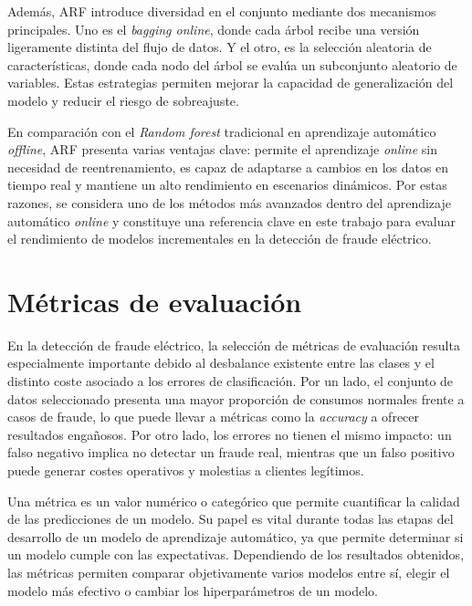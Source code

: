 \documentclass[12pt,a4paper]{report}
\begin{document}
Además, ARF introduce diversidad en el conjunto mediante dos mecanismos principales. Uno es el \emph{bagging online}, donde cada árbol recibe una versión ligeramente distinta del flujo de datos. Y el otro, es la selección aleatoria de características, donde cada nodo del árbol se evalúa un subconjunto aleatorio de variables. Estas estrategias permiten mejorar la capacidad de generalización del modelo y reducir el riesgo de sobreajuste.

En comparación con el \emph{Random forest} tradicional en aprendizaje automático \emph{offline}, ARF presenta varias ventajas clave: permite el aprendizaje \emph{online} sin necesidad de reentrenamiento, es capaz de adaptarse a cambios en los datos en tiempo real y mantiene un alto rendimiento en escenarios dinámicos. Por estas razones, se considera uno de los métodos más avanzados dentro del aprendizaje automático \emph{online} y constituye una referencia clave en este trabajo para evaluar el rendimiento de modelos incrementales en la detección de fraude eléctrico.


\chapter{Métricas de evaluación}

En la detección de fraude eléctrico, la selección de métricas de evaluación resulta especialmente importante debido al desbalance existente entre las clases y el distinto coste asociado a los errores de clasificación. Por un lado, el conjunto de datos seleccionado presenta una mayor proporción de consumos normales frente a casos de fraude, lo que puede llevar a métricas como la \emph{accuracy} a ofrecer resultados engañosos. Por otro lado, los errores no tienen el mismo impacto: un falso negativo implica no detectar un fraude real, mientras que un falso positivo puede generar costes operativos y molestias a clientes legítimos.

Una métrica es un valor numérico o categórico que permite cuantificar la calidad de las predicciones de un modelo. Su papel es vital durante todas las etapas del desarrollo de un modelo de aprendizaje automático, ya que permite determinar si un modelo cumple con las expectativas. Dependiendo de los resultados obtenidos, las métricas permiten comparar objetivamente varios modelos entre sí, elegir el modelo más efectivo o cambiar los hiperparámetros de un modelo.
\end{document}
